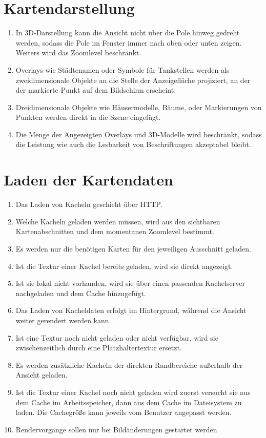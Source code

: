 \documentclass[10pt]{scrreprt}
\newcommand{\ziel}[1]{{\fontsize{9.5}{11}\textsf{/#1/}}}
\newcommand{\ziellabel}{Z}
\newcommand{\muss}{\renewcommand{\labelenumi}{\textbf{\ziel{\ziellabel\numprint{\theenumi}0}}}}
\newcommand{\wunsch}{\renewcommand{\labelenumi}{\textbf{\ziel{\ziellabel\numprint{\theenumi}0W}}}}
\begin{document}
\section{Kartendarstellung}
\begin{enumerate}[leftmargin=2.2cm,resume]
\item In 3D-Darstellung kann die Ansicht nicht über die Pole hinweg gedreht werden, sodass die Pole im Fenster immer nach oben oder unten zeigen. Weiters wird das Zoomlevel beschränkt.
\item Overlays wie Städtenamen oder Symbole für Tankstellen werden als zweidimensionale Objekte an die Stelle der Anzeigefläche projiziert, an der der markierte Punkt auf dem Bildschirm erscheint.
\wunsch
\item Dreidimensionale Objekte wie Häusermodelle, Bäume, oder  Markierungen von Punkten werden direkt in die Szene eingefügt.
\muss
\item Die Menge der Angezeigten Overlays und 3D-Modelle wird beschränkt, sodass die Leistung wie auch die Lesbarkeit von Beschriftungen akzeptabel bleibt.
\end{enumerate}

\section{Laden der Kartendaten}
\begin{enumerate}[resume,leftmargin=2.2cm]
\item Das Laden von Kacheln geschieht über HTTP.
\item Welche Kacheln geladen werden müssen, wird  aus den sichtbaren Kartenabschnitten und dem momentanen Zoomlevel bestimmt.
\item Es werden nur die benötigen Karten für den jeweiligen Ausschnitt geladen.
\item Ist die Textur einer Kachel bereits geladen, wird sie direkt angezeigt.
\item Ist sie lokal nicht vorhanden, wird sie über einen passenden Kachelserver nachgeladen und dem Cache hinzugefügt.
\item Das Laden von Kacheldaten erfolgt im Hintergrund, während die Ansicht weiter gerendert werden kann.
\wunsch
\item Ist eine Textur noch nicht geladen oder nicht verfügbar, wird sie zwischenzeitlich durch eine Platzhaltertextur ersetzt.
\item Es werden zusätzliche Kacheln der direkten Randbereiche außerhalb der Ansicht geladen.
\item Ist die Textur einer Kachel noch nicht geladen wird zuerst versucht sie aus dem Cache im Arbeitsspeicher, dann aus dem Cache im Dateisystem zu laden. Die Cachegröße kann jeweils vom Benutzer angepasst werden.
\item Rendervorgänge sollen nur bei Bildänderungen gestartet werden
\end{enumerate}
\end{document}
